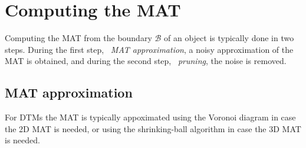 \section{Computing the MAT} 
Computing the MAT from the boundary $\mathcal{B}$ of an object is typically done in two steps. 
During the first step, \ie\ \emph{MAT approximation}, a noisy approximation of the MAT is obtained, and during the second step, \ie\ \emph{pruning}, the noise is removed.

\subsection{MAT approximation}
For DTMs the MAT is typically appoximated using the Voronoi diagram in case the 2D MAT is needed, or using the shrinking-ball algorithm in case the 3D MAT is needed.




